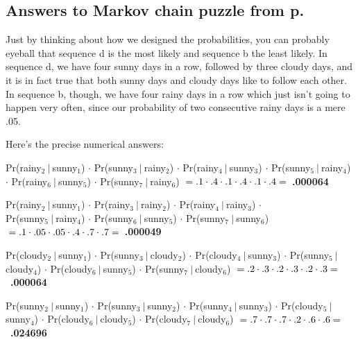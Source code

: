 \begin{alttitles}
\vfill
\pagebreak

\subsection*{Answers to Markov chain puzzle from
p.~\pageref{markovPuzzle}}

Just by thinking about how we designed the probabilities, you can probably
eyeball that sequence d is the most likely and sequence b the least likely. In
sequence d, we have four sunny days in a row, followed by three cloudy days,
and it is in fact true that both sunny days and cloudy days like to follow each
other. In sequence b, though, we have four rainy days in a row which just
isn't going to happen very often, since our probability of two consecutive
rainy days is a mere .05.

Here's the precise numerical answers:

\begin{compactenum}[a.]
\small
\item
Pr(rainy$_2\ |\ $sunny$_1$) $\cdot$
Pr(sunny$_3\ |\ $rainy$_2$) $\cdot$
Pr(rainy$_4\ |\ $sunny$_3$) $\cdot$
Pr(sunny$_5\ |\ $rainy$_4$) $\cdot$
Pr(rainy$_6\ |\ $sunny$_5$) $\cdot$
Pr(sunny$_7\ |\ $rainy$_6$) $\\=
.1 \cdot .4 \cdot .1 \cdot .4 \cdot .1 \cdot .4 = $\ \textbf{.000064} \\
\item
Pr(rainy$_2\ |\ $sunny$_1$) $\cdot$
Pr(rainy$_3\ |\ $rainy$_2$) $\cdot$
Pr(rainy$_4\ |\ $rainy$_3$) $\cdot$\\
Pr(sunny$_5\ |\ $rainy$_4$) $\cdot$
Pr(sunny$_6\ |\ $sunny$_5$) $\cdot$
Pr(sunny$_7\ |\ $sunny$_6$) $\\=
.1 \cdot .05 \cdot .05 \cdot .4 \cdot .7 \cdot .7 = $\ \textbf{.000049} \\
\item
Pr(cloudy$_2\ |\ $sunny$_1$) $\cdot$
Pr(sunny$_3\ |\ $cloudy$_2$) $\cdot$
Pr(cloudy$_4\ |\ $sunny$_3$) $\cdot$
Pr(sunny$_5\ |\ $cloudy$_4$) $\cdot$
Pr(cloudy$_6\ |\ $sunny$_5$) $\cdot$
Pr(sunny$_7\ |\ $cloudy$_6$) $\\=
.2 \cdot .3 \cdot .2 \cdot .3 \cdot .2 \cdot .3 = $\ \textbf{.000064} \\
\item
Pr(sunny$_2\ |\ $sunny$_1$) $\cdot$
Pr(sunny$_3\ |\ $sunny$_2$) $\cdot$
Pr(sunny$_4\ |\ $sunny$_3$) $\cdot$
Pr(cloudy$_5\ |\ $sunny$_4$) $\cdot$
Pr(cloudy$_6\ |\ $cloudy$_5$) $\cdot$
Pr(cloudy$_7\ |\ $cloudy$_6$) $\\=
.7 \cdot .7 \cdot .7 \cdot .2 \cdot .6 \cdot .6 = $\ \textbf{.024696} \\


\end{compactenum}
\end{alttitles}
